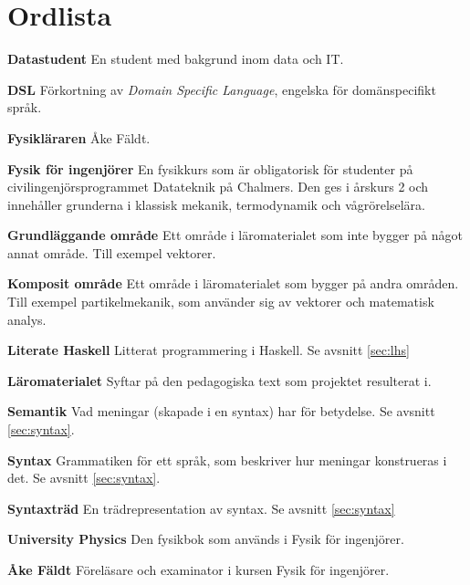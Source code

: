 
\chapter*{Ordlista}

\textbf{Datastudent} En student med bakgrund inom data och IT.

\textbf{DSL} Förkortning av \textit{Domain Specific Language}, engelska för domänspecifikt språk.

\textbf{Fysikläraren} Åke Fäldt.

\textbf{Fysik för ingenjörer} En fysikkurs som är obligatorisk för studenter på civilingenjörsprogrammet Datateknik på Chalmers. Den ges i årskurs 2 och innehåller grunderna i klassisk mekanik, termodynamik och vågrörelselära.

\textbf{Grundläggande område} Ett område i läromaterialet som inte bygger på något annat område. Till exempel vektorer.

\textbf{Komposit område} Ett område i läromaterialet som bygger på andra områden. Till exempel partikelmekanik, som använder sig av vektorer och matematisk analys.

\textbf{Literate Haskell} Litterat programmering i Haskell. Se avsnitt \ref{sec:lhs}

\textbf{Läromaterialet} Syftar på den pedagogiska text som projektet resulterat i.

\textbf{Semantik} Vad meningar (skapade i en syntax) har för betydelse. Se avsnitt \ref{sec:syntax}.

\textbf{Syntax} Grammatiken för ett språk, som beskriver hur meningar konstrueras i det. Se avsnitt \ref{sec:syntax}.

\textbf{Syntaxträd} En trädrepresentation av syntax. Se avsnitt \ref{sec:syntax}

\textbf{University Physics} Den fysikbok som används i Fysik för ingenjörer.

\textbf{Åke Fäldt} Föreläsare och examinator i kursen Fysik för ingenjörer.

